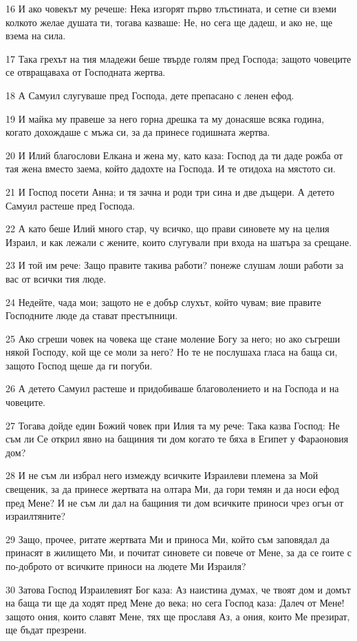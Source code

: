 \par 16 И ако човекът му речеше: Нека изгорят първо тлъстината, и сетне си вземи колкото желае душата ти, тогава казваше: Не, но сега ще дадеш, и ако не, ще взема на сила.
\par 17 Така грехът на тия младежи беше твърде голям пред Господа; защото човеците се отвращаваха от Господната жертва.
\par 18 А Самуил слугуваше пред Господа, дете препасано с ленен ефод.
\par 19 И майка му правеше за него горна дрешка та му донасяше всяка година, когато дохождаше с мъжа си, за да принесе годишната жертва.
\par 20 И Илий благослови Елкана и жена му, като каза: Господ да ти даде рожба от тая жена вместо заема, който дадохте на Господа. И те отидоха на мястото си.
\par 21 И Господ посети Анна; и тя зачна и роди три сина и две дъщери. А детето Самуил растеше пред Господа.
\par 22 А като беше Илий много стар, чу всичко, що прави синовете му на целия Израил, и как лежали с жените, които слугували при входа на шатъра за срещане.
\par 23 И той им рече: Защо правите такива работи? понеже слушам лоши работи за вас от всички тия люде.
\par 24 Недейте, чада мои; защото не е добър слухът, който чувам; вие правите Господните люде да стават престъпници.
\par 25 Ако сгреши човек на човека ще стане моление Богу за него; но ако съгреши някой Господу, кой ще се моли за него? Но те не послушаха гласа на баща си, защото Господ щеше да ги погуби.
\par 26 А детето Самуил растеше и придобиваше благоволението и на Господа и на човеците.
\par 27 Тогава дойде един Божий човек при Илия та му рече: Така казва Господ: Не съм ли Се открил явно на бащиния ти дом когато те бяха в Египет у Фараоновия дом?
\par 28 И не съм ли избрал него измежду всичките Израилеви племена за Мой свещеник, за да принесе жертвата на олтара Ми, да гори темян и да носи ефод пред Мене? И не съм ли дал на бащиния ти дом всичките приноси чрез огън от израилтяните?
\par 29 Защо, прочее, ритате жертвата Ми и приноса Ми, който съм заповядал да принасят в жилището Ми, и почитат синовете си повече от Мене, за да се гоите с по-доброто от всичките приноси на людете Ми Израиля?
\par 30 Затова Господ Израилевият Бог каза: Аз наистина думах, че твоят дом и домът на баща ти ще да ходят пред Мене до века; но сега Господ каза: Далеч от Мене! защото ония, които славят Мене, тях ще прославя Аз, а ония, които Ме презират, ще бъдат презрени.
